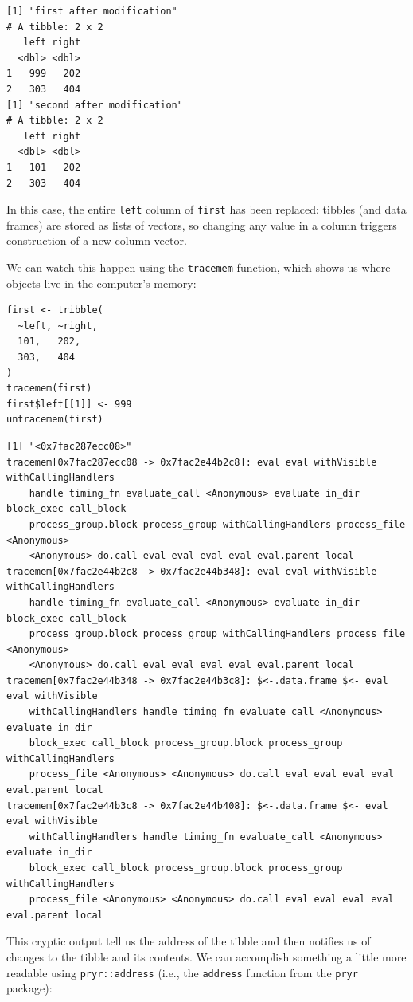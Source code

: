 \begin{lstlisting}
[1] "first after modification"
# A tibble: 2 x 2
   left right
  <dbl> <dbl>
1   999   202
2   303   404
[1] "second after modification"
# A tibble: 2 x 2
   left right
  <dbl> <dbl>
1   101   202
2   303   404
\end{lstlisting}

\noindent
In this case,
the entire \texttt{left} column of \texttt{first} has been replaced:
tibbles (and data frames) are stored as lists of vectors,
so changing any value in a column triggers construction of a new column vector.

We can watch this happen using the \texttt{tracemem} function,
which shows us where objects live in the computer's memory:

\begin{lstlisting}
first <- tribble(
  ~left, ~right,
  101,   202,
  303,   404
)
tracemem(first)
first$left[[1]] <- 999
untracemem(first)
\end{lstlisting}

\begin{lstlisting}
[1] "<0x7fac287ecc08>"
tracemem[0x7fac287ecc08 -> 0x7fac2e44b2c8]: eval eval withVisible withCallingHandlers
    handle timing_fn evaluate_call <Anonymous> evaluate in_dir block_exec call_block
    process_group.block process_group withCallingHandlers process_file <Anonymous>
    <Anonymous> do.call eval eval eval eval eval.parent local 
tracemem[0x7fac2e44b2c8 -> 0x7fac2e44b348]: eval eval withVisible withCallingHandlers
    handle timing_fn evaluate_call <Anonymous> evaluate in_dir block_exec call_block
    process_group.block process_group withCallingHandlers process_file <Anonymous>
    <Anonymous> do.call eval eval eval eval eval.parent local 
tracemem[0x7fac2e44b348 -> 0x7fac2e44b3c8]: $<-.data.frame $<- eval eval withVisible
    withCallingHandlers handle timing_fn evaluate_call <Anonymous> evaluate in_dir
    block_exec call_block process_group.block process_group withCallingHandlers
    process_file <Anonymous> <Anonymous> do.call eval eval eval eval eval.parent local 
tracemem[0x7fac2e44b3c8 -> 0x7fac2e44b408]: $<-.data.frame $<- eval eval withVisible
    withCallingHandlers handle timing_fn evaluate_call <Anonymous> evaluate in_dir
    block_exec call_block process_group.block process_group withCallingHandlers
    process_file <Anonymous> <Anonymous> do.call eval eval eval eval eval.parent local 
\end{lstlisting}

\noindent
This cryptic output tell us the address of the tibble
and then notifies us of changes to the tibble and its contents.
We can accomplish something a little more readable using \texttt{pryr::address}
(i.e., the \texttt{address} function from the \texttt{pryr} package):

